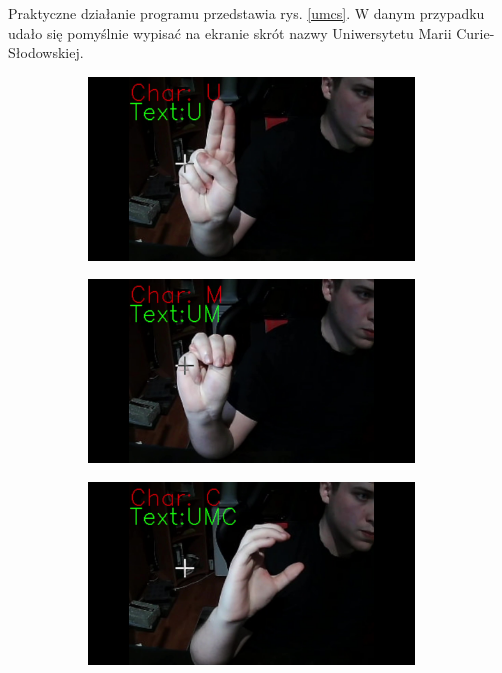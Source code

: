 \documentclass[a4paper,12pt,oneside]{book} %
\begin{document}
Praktyczne działanie programu przedstawia rys. \ref{umcs}. W danym przypadku udało się pomyślnie wypisać na ekranie skrót nazwy Uniwersytetu Marii Curie-Słodowskiej.

\begin{figure}[h]
	\centering
	\begin{subfigure}{0.4\textwidth}
		\centering
		\includegraphics[width=0.95\textwidth]{U.jpg}
	\end{subfigure}
	\begin{subfigure}{0.4\textwidth}
		\centering
		\includegraphics[width=0.95\textwidth]{UM.jpg}
	\end{subfigure}
	\begin{subfigure}{0.4\textwidth}
		\centering
		\includegraphics[width=0.95\textwidth]{UMC.jpg}

\end{subfigure}
\end{figure}
\end{document}
